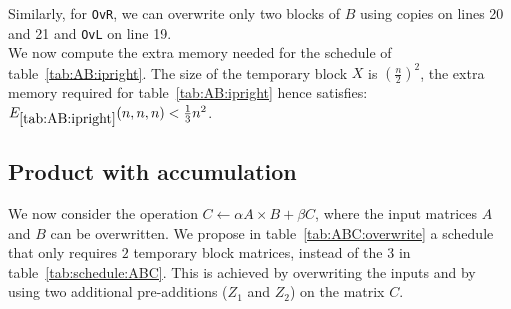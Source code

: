 \documentclass{article}
\newcommand{\ipl}{\texttt{OvL}\xspace}
\newcommand{\ipr}{\texttt{OvR}\xspace}
\begin{document}
Similarly, for \ipr, we can overwrite only two blocks of $B$ using copies on lines 20 and 21 and \ipl on line 19.\\
We now compute the extra memory needed for the schedule of table~\ref{tab:AB:ipright}.
The size of the temporary block $X$ is $\left(\frac{n}{2}\right)^2$, 
the extra memory required for table~\ref{tab:AB:ipright} hence satisfies:
$E_{\ref{tab:AB:ipright}}(n,n,n) < \frac{1}{3} n^2$.
\subsection{Product with accumulation}
We now consider the operation $C\leftarrow \alpha A\times B + \beta C$,
where the input matrices $A$ and $B$ can be overwritten. We propose in table~\ref{tab:ABC:overwrite} a schedule that only requires $2$ temporary block
matrices, instead of the $3$ in table~\ref{tab:schedule:ABC}. This is
achieved by overwriting the inputs and by using two additional pre-additions ($Z_1$ and $Z_2$) on the matrix $C$.
\arraycolsep 0pt
\end{document}
